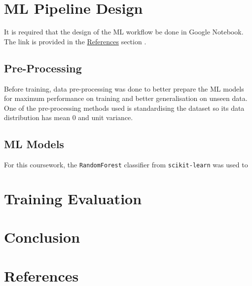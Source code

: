 \documentclass[12pt]{article}
\begin{document}




    
    \section{ML Pipeline Design}

    It is required that the design of the ML workflow be done in Google Notebook. The link is provided in the
    \hyperref[sec:references]{References} section \cite{binary_dataset, multi_dataset}. 

        \subsection{Pre-Processing}

            Before training, data pre-processing was done to better prepare the ML models for maximum performance on
            training and better generalisation on unseen data. One of the pre-processing methods used is standardising
            the dataset so its data distribution has mean 0 and unit variance.  

        \subsection{ML Models}

            For this coursework, the \verb|RandomForest| classifier from \verb|scikit-learn| was used to 

    \section{Training Evaluation}

    \section{Conclusion}

    \newpage

    \section{References}
    \label{sec:references}
    
        \printbibliography[heading = none]
\end{document}
